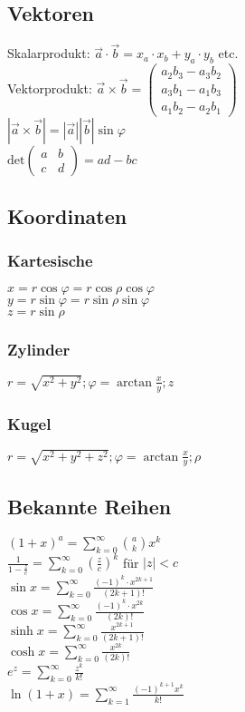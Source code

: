     \subsection{Vektoren}
        Skalarprodukt: $\vec{a}\cdot\vec{b}=x_a\cdot x_b+y_a\cdot y_b$ etc. \\
        Vektorprodukt: $\vec{a}\times\vec{b}= \begin{pmatrix}
            a_2b_3 - a_3b_2 \\
            a_3b_1 - a_1b_3 \\
            a_1b_2 - a_2b_1
        \end{pmatrix}$ \\
        $|\vec{a} \times \vec{b}| = |\vec{a}||\vec{b}|\sin{\varphi}$ \\
        $\mathrm{det}\begin{pmatrix}
            a & b \\
            c & d
        \end{pmatrix} = ad - bc$
    \subsection{Koordinaten}
        \subsubsection{Kartesische}
            $x = r\cos\varphi = r\cos\rho\cos\varphi$ \\
            $y = r\sin\varphi = r\sin\rho\sin\varphi$ \\
            $z = r\sin\rho$
        \subsubsection{Zylinder}
            $r=\sqrt{x^2+y^2}; \varphi = \arctan{\frac{x}{y}}; z$
        \subsubsection{Kugel}
            $r=\sqrt{x^2+y^2+z^2}; \varphi = \arctan{\frac{x}{y}}; \rho$
    \subsection{Bekannte Reihen}
        $\displaystyle (1+x)^a = \sum_{k=0}^{\infty}\binom{a}{k}x^k$ \\
        $\displaystyle \frac{1}{1-\frac{z}{c}} = \sum_{k=0}^{\infty}\left(\frac{z}{c}\right)^k$ für $|z| < c$ \\
        $\displaystyle \sin{x} = \sum_{k=0}^{\infty}\frac{(-1)^k\cdot x^{2k+1}}{(2k+1)!}$ \\
        $\displaystyle \cos{x} = \sum_{k=0}^{\infty}\frac{(-1)^k\cdot x^{2k}}{(2k)!}$ \\
        $\displaystyle \sinh{x} = \sum_{k=0}^{\infty}\frac{x^{2k+1}}{(2k+1)!}$ \\
        $\displaystyle \cosh{x} = \sum_{k=0}^{\infty}\frac{x^{2k}}{(2k)!}$ \\
        $\displaystyle e^z = \sum_{k=0}^{\infty}\frac{z^k}{k!}$ \\
        $\displaystyle \ln(1+x) = \sum_{k=1}^{\infty}\frac{(-1)^{k+1}x^k}{k!}$
